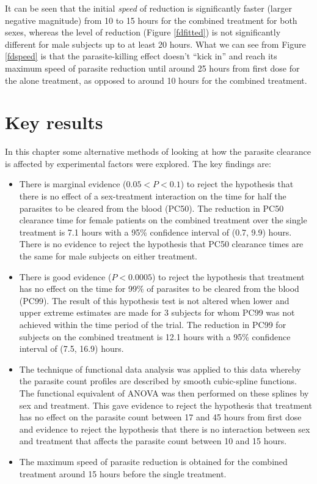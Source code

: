 It can be seen that the initial \emph{speed} of reduction is significantly faster (larger negative magnitude) from 10 to 15 hours for the combined treatment for both sexes, whereas the level of reduction (Figure \ref{fdfitted}) is not significantly different for male subjects up to at least 20 hours. What we can see from Figure \ref{fdspeed} is that the parasite-killing effect doesn't ``kick in'' and reach its maximum speed of parasite reduction until around 25 hours from first dose for the alone treatment, as opposed to around 10 hours for the combined treatment.

\clearpage
\section{Key results}
In this chapter some alternative methods of looking at how the parasite clearance is affected by experimental factors were explored. The key findings are:
\begin{itemize}
\item There is marginal evidence ($0.05<P<0.1$) to reject the hypothesis that there is no effect of a sex-treatment interaction on the time for half the parasites to be cleared from the blood (PC50). The reduction in PC50 clearance time for female patients on the combined treatment over the single treatment is 7.1 hours with a 95\% confidence interval of (0.7, 9.9) hours. There is no evidence to reject the hypothesis that PC50 clearance times are the same for male subjects on either treatment.
\item There is good evidence ($P<0.0005$) to reject the hypothesis that treatment has no effect on the time for 99\% of parasites to be cleared from the blood (PC99). The result of this hypothesis test is not altered when lower and upper extreme estimates are made for 3 subjects for whom PC99 was not achieved within the time period of the trial. The reduction in PC99 for subjects on the combined treatment is 12.1 hours with a 95\% confidence interval of (7.5, 16.9) hours.
\item The technique of functional data analysis was applied to this data whereby the parasite count profiles are described by smooth cubic-spline functions. The functional equivalent of ANOVA was then performed on these splines by sex and treatment. This gave evidence to reject the hypothesis that treatment has no effect on the parasite count between 17 and 45 hours from first dose and evidence to reject the hypothesis that there is no interaction between sex and treatment that affects the parasite count between 10 and 15 hours.
\item The maximum speed of parasite reduction is obtained for the combined treatment around 15 hours before the single treatment.
\end{itemize}